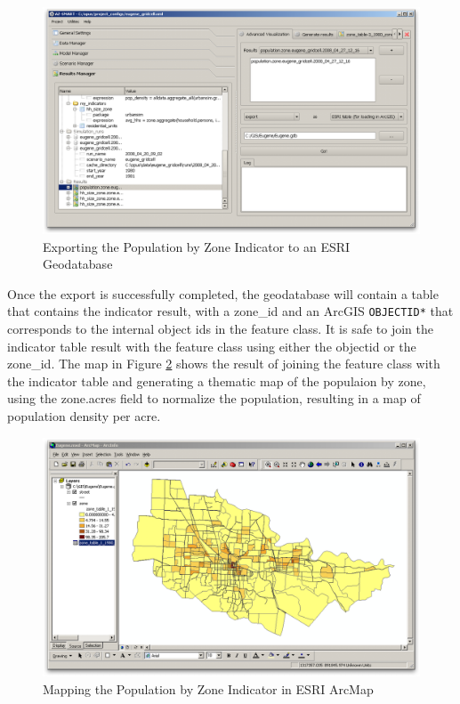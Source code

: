 \begin{figure}[htp]
\begin{center}
\includegraphics[scale=0.4]{graphics/indicator-population-zone-export.png}
\end{center}
\caption{Exporting the Population by Zone Indicator to an ESRI Geodatabase}
\label{fig:indicator-population-zone-export}
\end{figure}

Once the export is successfully completed, the geodatabase will contain a table that contains the indicator result, with a zone\_id and an ArcGIS \verb#OBJECTID*# that corresponds to the internal object ids in the feature class.  It is safe to join the indicator table result with the feature class using either the objectid or the zone\_id.  The map in Figure \ref{fig:indicator-population-zone-arcgis} shows the result of joining the feature class with the indicator table and generating a thematic map of the populaion by zone, using the zone.acres field to normalize the population, resulting in a map of population density per acre.

\begin{figure}[htp]
\begin{center}
\includegraphics[scale=0.4]{graphics/indicator-population-zone-arcgis.png}
\end{center}
\caption{Mapping the Population by Zone Indicator in ESRI ArcMap}
\label{fig:indicator-population-zone-arcgis}
\end{figure}

